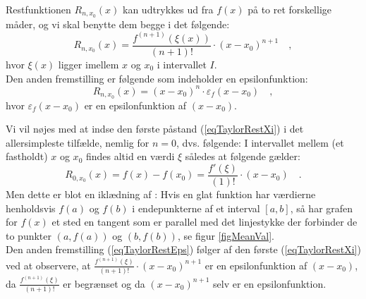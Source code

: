 \begin{lemma}[Restfunktioner]
Restfunktionen $R_{n, x_{0}}(x)$  kan udtrykkes ud fra $f(x)$  på to ret forskellige måder, og vi skal benytte dem begge i det følgende:
\begin{equation} \label{eqTaylorRestXi}
R_{n, x_{0}}(x) =  \frac{f^{(n+1)}(\xi(x))}{(n+1)!}\cdot(x-x_{0})^{n+1} \quad,
\end{equation}
hvor $\xi(x)$ ligger imellem $x$ og $x_{0}$ i intervallet $I$.\\

  Den anden fremstilling er følgende som indeholder en epsilonfunktion:
\begin{equation} \label{eqTaylorRestEps}
R_{n, x_{0}}(x) =  (x-x_{0})^{n}\cdot \varepsilon_{f}(x-x_{0}) \quad,
\end{equation}
hvor $\varepsilon_{f}(x-x_{0})$ er en epsilonfunktion af $(x-x_{0})$.
\end{lemma}
\begin{bevis}
Vi vil nøjes med at indse den første påstand (\ref{eqTaylorRestXi}) i det allersimpleste tilfælde, nemlig for $n=0$, dvs. følgende: I intervallet mellem (et fastholdt) $x$ og $x_{0}$ findes altid en værdi $\xi$ således at følgende gælder:
\begin{equation}
R_{0, x_{0}}(x) =  f(x) - f(x_{0}) = \frac{f'(\xi)}{(1)!}\cdot(x-x_{0}) \quad.
\end{equation}
Men dette er blot en iklædning af : Hvis en glat funktion har værdierne henholdsvis $f(a)$  og $f(b)$ i endepunkterne af et interval $[a, b]$, så har grafen for $f(x)$ et sted en tangent som er parallel med det linjestykke der forbinder de to punkter  $(a, f(a))$ og  $(b, f(b))$, se figur \ref{figMeanVal}.\\

Den anden fremstilling (\ref{eqTaylorRestEps}) følger af den første (\ref{eqTaylorRestXi}) ved  at observere, at
$\frac{f^{(n+1)}(\xi)}{(n+1)!}\cdot(x-x_{0})^{n+1}$ er en epsilonfunktion af $(x-x_{0})$, da $\frac{f^{(n+1)}(\xi)}{(n+1)!}$ er begrænset og da $(x-x_{0})^{n+1}$ selv er en epsilonfunktion.
\end{bevis}

